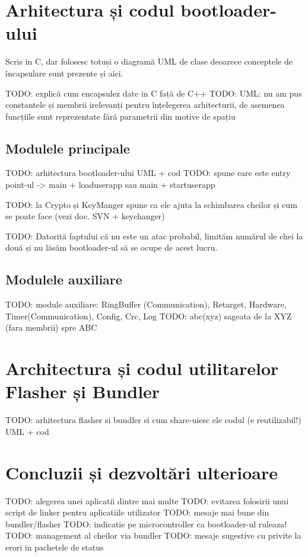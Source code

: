 \documentclass[12pt,a4paper,titlepage]{report}
\begin{document}
\section{Arhitectura și codul bootloader-ului}
Scris in C, dar folosesc totuși o diagramă UML de clase deoarece conceptele de încapsulare sunt prezente și aici.

TODO: explică cum encapsulez date in C față de C++
TODO: UML: nu am pus constantele și membrii irelevanți pentru înțelegerea arhitecturii, de asemenea funcțiile sunt reprezentate fără parametrii din motive de spațiu

\subsection{Modulele principale}
TODO: arhitectura bootloader-ului UML + cod
TODO: spune care este entry point-ul -> main + loaduserapp sau main + startuserapp

TODO: la Crypto și KeyManger spune ca ele ajuta la schimbarea cheilor și cum se poate face (vezi doc. SVN + keychanger)

TODO: Datorită faptului că nu este un atac probabil, limităm numărul de chei la două și nu lăsăm bootloader-ul să se ocupe de acest lucru.

\subsection{Modulele auxiliare}
TODO: module auxiliare: RingBuffer (Communication), Retarget, Hardware, Timer(Communication), Config, Crc, Log
TODO: abc(xyz) sageata de la XYZ (fara membrii) spre ABC

\section{Architectura și codul utilitarelor Flasher și Bundler}
TODO: arhitectura flasher si bundler si cum share-uiesc ele codul (e reutilizabil!) UML + cod

\section{Concluzii și dezvoltări ulterioare}
TODO: alegerea unei aplicatii dintre mai multe
TODO: evitarea folosirii unui script de linker pentru aplicatiile utilizator
TODO: mesaje mai bune din bundler/flasher
TODO: indicatie pe microcontroller ca bootloader-ul ruleaza!
TODO: management al cheilor via bundler
TODO: mesaje sugestive cu privite la erori in pachetele de status

\newpage


\end{document}
